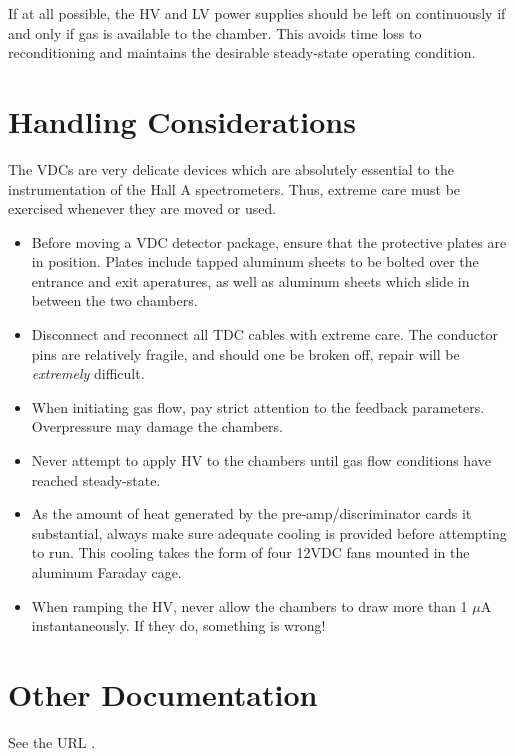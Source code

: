 {If at all possible, the HV and LV power supplies should be left
on continuously if and only if gas is available to the chamber.  This
avoids time loss to reconditioning and maintains the desirable
steady-state operating condition.

\section{Handling Considerations}

The VDCs are very delicate devices which are absolutely essential to
the instrumentation of the Hall A spectrometers.  Thus, extreme care
must be exercised whenever they are moved or used.

\begin{itemize}
\item{Before moving a VDC detector package, ensure that the protective
plates are in position.  Plates include tapped aluminum sheets to
be bolted over the entrance and exit aperatures, as well as aluminum
sheets which slide in between the two chambers.}
\item{Disconnect and reconnect all TDC cables with extreme care.  The
conductor pins are relatively fragile, and should one be broken off,
repair will be {\it extremely} difficult.}
\item{When initiating gas flow, pay strict attention to the feedback
parameters.  Overpressure may damage the chambers.}
\item{Never attempt to apply HV to the chambers until gas flow
conditions have reached steady-state.}
\item{As the amount of heat generated by the pre-amp/discriminator
cards it substantial, always make sure adequate cooling is provided
before attempting to run.  This cooling takes the form of
four 12VDC fans mounted in the aluminum Faraday cage.}
\item{When ramping the HV, never allow the chambers to draw more than
1 $\mu$A instantaneously.  If they do, something is wrong!}
\end{itemize}

\section{Other Documentation}
See the URL%
.
} %

